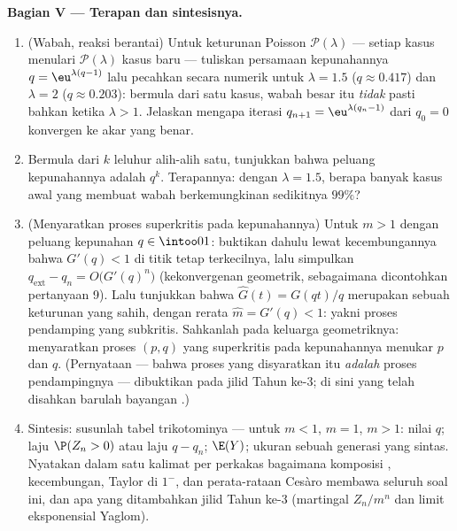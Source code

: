 \begin{problem}
\medskip
\noindent\textbf{Bagian V --- Terapan dan sintesisnya.}
\begin{enumerate}[resume]
  \item (Wabah, reaksi berantai) Untuk  keturunan Poisson
        $\mathcal P(\lambda)$ --- setiap kasus menulari
        $\mathcal P(\lambda)$ kasus baru --- tuliskan
        persamaan kepunahannya $q = \eu^{\lambda(q-1)}$ lalu
        pecahkan secara numerik untuk $\lambda = 1.5$ ($q \approx
        0.417$) dan $\lambda = 2$ ($q \approx 0.203$):
        bermula dari satu kasus, wabah besar itu
        \emph{tidak} pasti bahkan ketika $\lambda > 1$. Jelaskan
        mengapa iterasi $q_{n+1} = \eu^{\lambda(q_n - 1)}$
        dari $q_0 = 0$ konvergen ke akar yang benar.
  \item Bermula dari $k$ leluhur alih-alih satu, tunjukkan bahwa
        peluang kepunahannya adalah $q^k$. Terapannya:
        dengan $\lambda = 1.5$, berapa banyak kasus awal yang membuat
        wabah berkemungkinan sedikitnya $99\%$?
  \item (Menyaratkan proses superkritis pada kepunahannya)
        Untuk $m > 1$ dengan peluang kepunahan $q \in
        \intoo01$: buktikan dahulu lewat kecembungannya bahwa $G'(q) < 1$
        di titik tetap terkecilnya, lalu simpulkan
        $q_{\mathrm{ext}} - q_n = O\bigl(G'(q)^n\bigr)$
        (kekonvergenan geometrik, sebagaimana dicontohkan pertanyaan 9).
        Lalu tunjukkan bahwa $\widehat G(t) = G(qt)/q$ merupakan  sebuah  keturunan yang sahih, dengan rerata $\widehat m =
        G'(q) < 1$: yakni proses pendamping yang subkritis. Sahkanlah
        pada keluarga geometriknya: menyaratkan proses
        $(p, q)$ yang superkritis pada kepunahannya menukar
        $p$ dan $q$. (Pernyataan  --- bahwa proses yang disyaratkan itu
        \emph{adalah} proses pendampingnya --- dibuktikan
        pada jilid Tahun ke-3; di sini yang telah disahkan barulah
        bayangan .)
  \item Sintesis: susunlah tabel trikotominya --- untuk $m <
        1$, $m = 1$, $m > 1$: nilai $q$; laju $\P(Z_n >
        0)$ atau laju $q - q_n$; $\E(Y)$; ukuran sebuah generasi
        yang sintas. Nyatakan dalam satu kalimat per perkakas bagaimana
        komposisi , kecembungan, Taylor di $1^-$, dan
        perata-rataan Cesàro membawa seluruh soal ini, dan apa
        yang ditambahkan jilid Tahun ke-3 (martingal $Z_n/m^n$ dan
         limit eksponensial Yaglom).

\end{enumerate}
\end{problem}
